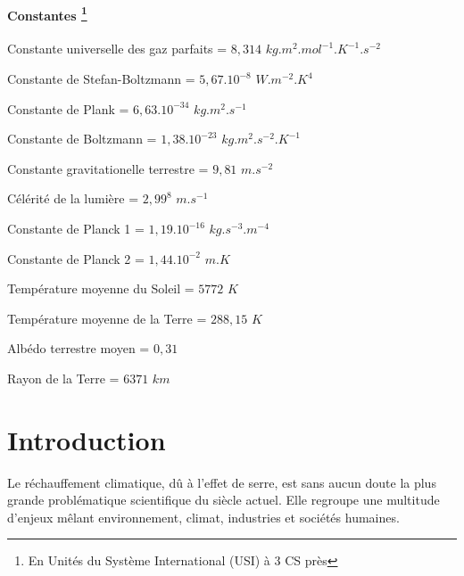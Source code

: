 \documentclass[a4paper, 12pt]{report} %
\begin{document}
\begin{description}
	\subsubsection*{Constantes \footnote{En Unités du Système International (USI) à 3 CS près}}
	\item[\boldmath{$R$}:] Constante universelle des gaz parfaits = $8,314$ $kg.m^2.mol^{-1}.K^{-1}.s^{-2}$
	\item[\boldmath{$\sigma$}:] Constante de Stefan-Boltzmann = $5,67.10^{-8}$ $W.m^{-2}.K^{4}$
	\item[\boldmath{$h$}:] Constante de Plank = $6,63.10^{-34}$ $kg.m^2.s^{-1}$
 	\item[\boldmath{$k_B$}:] Constante de Boltzmann = $1,38.10^{-23}$ $kg.m^2.s^{-2}.K^{-1}$
  	\item[\boldmath{$g$}:] Constante gravitationelle terrestre = $9,81$ $m.s^{-2}$
   	\item[\boldmath{$c_0$}:] Célérité de la lumière = $2,99^8$ $m.s^{-1}$
    \item[\boldmath{$C_1$}:] Constante de Planck 1 = $1,19.10^{-16}$ $kg.s^{-3}.m^{-4}$
    \item[\boldmath{$C_2$}:] Constante de Planck 2 = $1,44.10^{-2}$ $m.K$
    \item[\boldmath{$T_s$}:] Température moyenne du Soleil = $5 772$ $K$
    \item[\boldmath{$T_T$}:] Température moyenne de la Terre = $288,15$ $K$
	\item[\boldmath{$\bar{a_T}$}:] Albédo terrestre moyen = $0,31$
    \item[\boldmath{$R_T$}:] Rayon de la Terre = $6 371$ $km$
\end{description}


\newpage
\chapter*{Introduction}				

\indent Le réchauffement climatique, dû à l'effet de serre, est sans aucun doute la plus grande problématique 
scientifique du siècle actuel. Elle regroupe une multitude d'enjeux mêlant environnement,
climat, industries et sociétés humaines. \vspace{\baselineskip}
\end{document}
